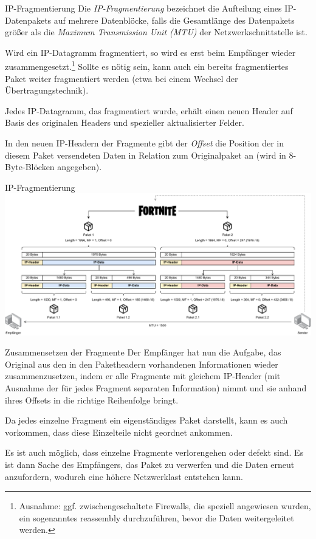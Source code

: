 \begin{defi}{IP-Fragmentierung}
    Die \emph{IP-Fragmentierung} bezeichnet die Aufteilung eines IP-Datenpakets auf mehrere Datenblöcke, falls die Gesamtlänge des Datenpakets größer als die \emph{Maximum Transmission Unit (MTU)} der Netzwerkschnittstelle ist.

    Wird ein IP-Datagramm fragmentiert, so wird es erst beim Empfänger wieder zusammengesetzt.\footnote{Ausnahme: ggf. zwischengeschaltete Firewalls, die speziell angewiesen wurden, ein sogenanntes reassembly durchzuführen, bevor die Daten weitergeleitet werden.}
    Sollte es nötig sein, kann auch ein bereits fragmentiertes Paket weiter fragmentiert werden (etwa bei einem Wechsel der Übertragungstechnik).

    Jedes IP-Datagramm, das fragmentiert wurde, erhält einen neuen Header auf Basis des originalen Headers und spezieller aktualisierter Felder.

    In den neuen IP-Headern der Fragmente gibt der \emph{Offset} die Position der in diesem Paket versendeten Daten in Relation zum Originalpaket an (wird in 8-Byte-Blöcken angegeben).
\end{defi}

\begin{example}{IP-Fragmentierung}
    \includegraphics[width=\textwidth]{includes/figures/example_fragmentierung.pdf}
\end{example}

\begin{bonus}{Zusammensetzen der Fragmente}
    Der Empfänger hat nun die Aufgabe, das Original aus den in den Paketheadern vorhandenen Informationen wieder zusammenzusetzen, indem er alle Fragmente mit gleichem IP-Header (mit Ausnahme der für jedes Fragment separaten Information) nimmt und sie anhand ihres Offsets in die richtige Reihenfolge bringt.

    Da jedes einzelne Fragment ein eigenständiges Paket darstellt, kann es auch vorkommen, dass diese Einzelteile nicht geordnet ankommen.

    Es ist auch möglich, dass einzelne Fragmente verlorengehen oder defekt sind.
    Es ist dann Sache des Empfängers, das Paket zu verwerfen und die Daten erneut anzufordern, wodurch eine höhere Netzwerklast entstehen kann.
\end{bonus}

